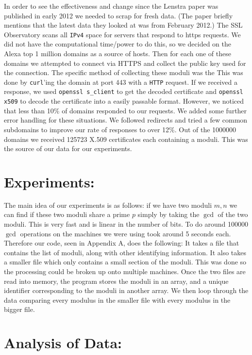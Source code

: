 \documentclass[12pt]{article}
\newcommand{\ty}[1]{\texttt{#1}}
\begin{document}
In order to see the effectiveness and change since the Lenstra paper was
published in early 2012 we needed to scrap for fresh data. (The paper briefly
mentions that the latest data they looked at was from February 2012.) The SSL
Observatory scans all \ty{IPv4} space for servers that respond to https requests. We
did not have the computational time/power to do this, so we decided on the Alexa
top 1 million domains as a source of hosts. Then for each one of these domains
we attempted to connect via HTTPS and collect the public key used for the
connection. The specific method of collecting these moduli was the  This was
done by \ty{curl}'ing the domain at port 443 with a \ty{HTTP} request. If we received a
response, we used \ty{openssl s\_client} to get the decoded certificate and
\ty{openssl x509} to decode the certificate into a easily passable format.
However, we noticed that less than 10\% of domains responded to our requests. We
added some further error handling for these situations. We followed redirects
and tried a few common subdomains to improve our rate of responses to over 12\%.
Out of the 1000000 domains we received 125723 X.509 certificates each containing
a moduli. This was the source of our data for our experiments.

\section{Experiments:}
The main idea of our experiments is as follows: if we have two moduli $m, n$ we
can find if these two moduli share a prime $p$ simply by taking the $\gcd$ of
the two moduli. This is very fast and is linear in the number of bits. To do
around 100000 $\gcd$ operations on the machines we were using took around 5
seconds each. Therefore our code, seen in Appendix A, does the following: It
takes a file that contains the list of moduli, along with other identifying 
information. It also takes a smaller file which only contains a small section of
the moduli. This was done so the processing could be broken up onto multiple
machines. Once the two files are read into memory, the program stores the moduli
in an array, and a unique identifier corresponding to the moduli in another
array. We then loop through the data comparing every modulus in the smaller file
with every modulus in the bigger file.

\section{Analysis of Data:}
\end{document}
